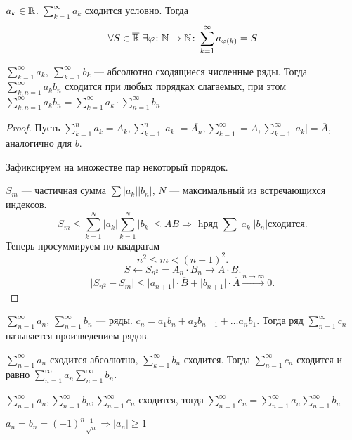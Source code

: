 \begin{thm}
    $ a_k \in  \mathbb{R}$. $ \sum_{k=1}^{\infty} a_k$ сходится условно. Тогда $$ \forall S \in  \overline{\mathbb{R}} ~ \exists \varphi  \colon \mathbb{N} \to \mathbb{N} \colon \sum_{k=1}^{\infty} a_{\varphi(k)} = S
    $$
\end{thm}
\begin{thm}
    $ \sum_{k=1}^{\infty} a_k, ~ \sum_{k=1}^{\infty}b_k $ --- абсолютно сходящиеся численные ряды. Тогда $ \sum_{k, n =1}^{\infty}a_k b_n $ сходится при любых порядках слагаемых, при этом $ \sum_{k,n=1}^{\infty} a_kb_n = \sum_{k=1}^{\infty} a_k \cdot \sum_{n=1}^{\infty}b_n $
\end{thm}
\begin{proof}
    Пусть $ \sum_{k=1}^{n} a_k = A_k, \sum_{k=1}^{n} \lvert a_k \rvert = \overline{A_n}, \sum_{k=1}^{\infty}  =A, \sum_{k=1}^{\infty} \lvert a_k \rvert = \overline{A} $, аналогично для $ b$.
    
    Зафиксируем на множестве пар некоторый порядок.

    $ S_m$ --- частичная сумма $ \sum \lvert a_k \rvert \lvert b_n \rvert $, $ N $ --- максимальный из встречающихся индексов.
    \[
	S_m \le \sum_{k=1}^{N}  \lvert a_k \rvert \sum_{k=1}^{N}  \lvert b_k \rvert \le \overline{A} \overline{B} \Longrightarrow \text{ hряд } \sum \lvert a_k \rvert \lvert b_n \rvert  \text{сходится}
    .\] 
    Теперь просуммируем по квадратам
    \[
	n^2 \le m <(n+1)^2
    .\] 
    \[
    S \leftarrow S_{n^2} = A_n\cdot  B_n \to  A\cdot B
    .\] 
    \[
	\lvert S_{n^2} - S_m \rvert \le \lvert a_{n+1} \rvert \cdot \overline{B} + \lvert b_{n+1} \rvert \cdot \overline{A} \stackrel{n \to  \infty}{\longrightarrow} 0
    .\] 
\end{proof}
\begin{defn}
    $ \sum_{n=1}^{\infty} a_n$, $ \sum_{n=1}^{\infty} b_n$ --- ряды. $ c_n = a_1b_n + a_2b_{n-1} + \ldots a_nb_1$. Тогда ряд $ \sum_{n=1}^{\infty} c_n$ называется {\sf  произведением рядов}.  
\end{defn}
\begin{thm}[Мергенс]
    $ \sum_{n=1}^{\infty} a_n$ сходится абсолютно, $ \sum_{k=1}^{\infty} b_n$ сходится. Тогда $ \sum_{n=1}^{\infty} c_n $ сходится и равно $ \sum_{n=1}^{\infty} a_n \sum_{n=1}^{\infty} b_n$.
\end{thm}
\begin{thm}[Абель]
    $ \sum_{n=1}^{\infty} a_n, \sum_{n=1}^{\infty} b_n, \sum_{n=1}^{\infty} c_n$ сходится, тогда $ \sum_{n=1}^{\infty} c_n = \sum_{n=1}^{\infty} a_n \sum_{n=1}^{\infty} b_n$
\end{thm}
\begin{ex}
    $ a_n = b_n = (-1)^{n}\frac{1}{\sqrt{ n} } \Longrightarrow  \lvert a_n \rvert \ge 1$
\end{ex}
